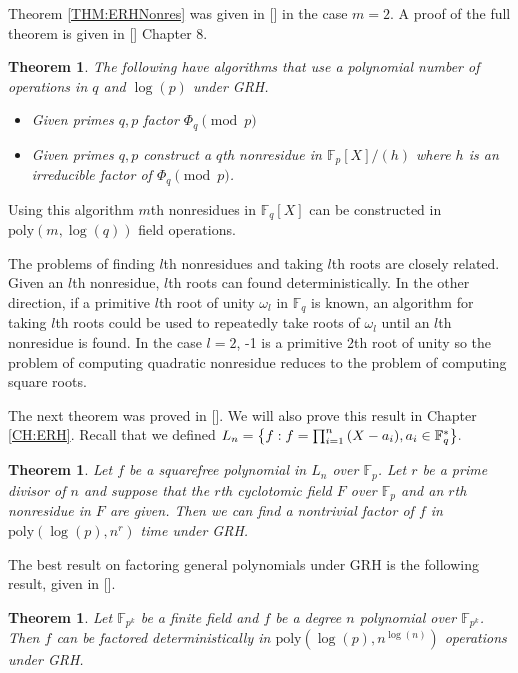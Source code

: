 \documentclass{article}
\let\originalleft\left
\let\originalright\right
\renewcommand{\left}{\mathopen{}\mathclose\bgroup\originalleft}
\renewcommand{\right}{\aftergroup\egroup\originalright}
\newcounter{dummy} \numberwithin{dummy}{section}
\theoremstyle{plain}
\newtheorem{thm}[dummy]{Theorem}
\theoremstyle{definition}
\def\Fp {{ \mathbb{F} _ {p} }}
\def\Fq {{ \mathbb{F} _ {q} }}
\def\FQ {{ \mathbb{F}^* _ {q} }}
\def\FpE {{ \mathbb{F} _ {p^k} }}
\def\poly {{ \mathrm{poly} }}
\begin{document}
		    Theorem \ref{THM:ERHNonres} was given in [] in the case $m=2$. A proof of the full theorem is given in [] Chapter 8. 

		    \begin{thm} 
		    \label{THM:Huang}
		        The following have algorithms that use a polynomial number of operations in $q$ and $\log(p)$ under GRH. 
						\begin{itemize}
		        \item Given primes $q, p$ factor $\Phi_q \pmod p$ 
		        \item Given primes $q, p$ construct a $q$th nonresidue in $\Fp[X]/(h)$ where $h$ is an irreducible factor of $\Phi_q \pmod p$. 
						\end{itemize}
		    \end{thm}

		    Using this algorithm $m$th nonresidues in $\Fq[X]$ can be constructed in $\poly(m, \log(q))$ field operations.

		    The problems of finding $l$th nonresidues and taking $l$th roots are closely related. Given an $l$th nonresidue, $l$th roots can found deterministically. In the other direction, if a primitive $l$th root of unity $\omega_l$ in $\Fq$ is known, an algorithm for taking $l$th roots could be used to repeatedly take roots of $\omega_l$ until an $l$th nonresidue is found. In the case $l = 2$, -1 is a primitive 2th root of unity so the problem of computing quadratic nonresidue reduces to the problem of computing square roots.
				
				The next theorem was proved in []. We will also prove this result in Chapter \ref{CH:ERH}. Recall that we defined $L_n=\left\{ f : f=\prod_{i=1}^n{(X-a_i)} , a_i \in \FQ \right\}.$
		
	      \begin{thm} 
				\label{THM:Ronyai}
			      Let $f$ be a squarefree polynomial in $L_n$ over $\Fp$. Let $r$ be a prime divisor of $n$ and suppose that the $r$th cyclotomic field $F$ over $\Fp$ and an $r$th nonresidue in $F$ are given. Then we can find a nontrivial factor of $f$ in $\poly(\log(p), n^r)$ time under GRH.
		    \end{thm}
				
				The best result on factoring general polynomials under GRH is the following result, given in [].
				
				\begin{thm} 
				\label{THM:Evo}
			      Let $\FpE$ be a finite field and $f$ be a degree $n$ polynomial over $\FpE$. Then $f$ can be factored deterministically in $\poly(\log(p),n^{\log(n)})$ operations under GRH. 
		    \end{thm}
				
\end{document}
